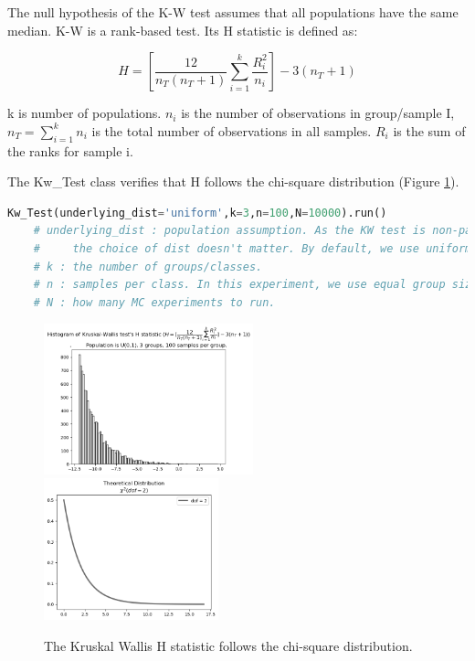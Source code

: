\documentclass[11pt, letterpaper]{article}
\begin{document}
The null hypothesis of the K-W test assumes that all populations have the same median.
K-W is a rank-based test. Its H statistic is defined as:

\begin{equation}
    \label{deqn_ex10}
    H=[\frac{12}{n_{T}(n_{T}+1)}\sum_{i=1}^{k}\frac{R_{i}^{2}}{n_{i}}]-3(n_{T}+1)
\end{equation}

\noindent k is number of populations. $n_{i}$ is the number of observations in group/sample I,
$n_{T}=\sum_{i=1}^{k}n_{i}$ is the total number of observations in all samples.
$R_{i}$ is the sum of the ranks for sample i.

The Kw\_Test class verifies that H follows the chi-square distribution (Figure \ref{fig:kw mc}).

\lstset{
    basicstyle=\footnotesize,
    xleftmargin=-1em,aboveskip=0.5em,belowskip=0.5em
}
\begin{lstlisting}[language=python]
    Kw_Test(underlying_dist='uniform',k=3,n=100,N=10000).run()
    # underlying_dist : population assumption. As the KW test is non-parametric, 
    #     the choice of dist doesn't matter. By default, we use uniform.
    # k : the number of groups/classes.
    # n : samples per class. In this experiment, we use equal group size, i.e., n1=n2=n3=...
    # N : how many MC experiments to run.
    \end{lstlisting}

\begin{figure}[htbp]
    \centering
    \includegraphics[width=0.54\textwidth]{fig11-kw mc1.png}
    \includegraphics[width=0.45\textwidth]{fig11-kw mc2.png}
    \caption{The Kruskal Wallis H statistic follows the chi-square distribution.}
    \label{fig:kw mc}
\end{figure}
\end{document}
